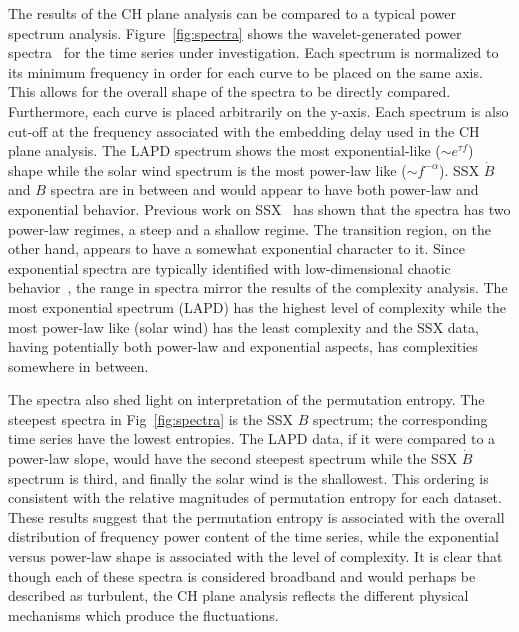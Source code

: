 \documentclass[aps,prx,twocolumn,secnumarabic,nobalancelastpage,amsmath,amssymb,
nofootinbib]{revtex4-1}
\begin{document}
The results of the CH plane analysis can be compared to a typical power spectrum analysis. Figure~\ref{fig:spectra} shows the wavelet-generated power spectra~\cite{torrence1998} for the time series under investigation. Each spectrum is normalized to its minimum frequency in order for each curve to be placed on the same axis. This allows for the overall shape of the spectra to be directly compared. Furthermore, each curve is placed arbitrarily on the y-axis. Each spectrum is also cut-off at the frequency associated with the embedding delay used in the CH plane analysis. The LAPD spectrum shows the most exponential-like ($\sim e^{\tau f}$) shape while the solar wind spectrum is the most power-law like ($\sim f^{-\alpha}$). SSX $\dot{B}$ and $B$ spectra are in between and would appear to have both power-law and exponential behavior. Previous work on SSX~\cite{schaffner2014c} has shown that the spectra has two power-law regimes, a steep and a shallow regime. The transition region, on the other hand, appears to have a somewhat exponential character to it. Since exponential spectra are typically identified with low-dimensional chaotic behavior~\cite{maggs2012}, the range in spectra mirror the results of the complexity analysis. The most exponential spectrum (LAPD) has the highest level of complexity while the most power-law like (solar wind) has the least complexity  and the SSX data, having potentially both power-law and exponential aspects, has complexities somewhere in between. 

The spectra also shed light on interpretation of the permutation entropy. The steepest spectra in Fig~\ref{fig:spectra} is the SSX $B$ spectrum; the corresponding time series have the lowest entropies. The LAPD data, if it were compared to a power-law slope, would have the second steepest spectrum while the SSX $\dot{B}$ spectrum is third, and finally the solar wind is the shallowest. This ordering is consistent with the relative magnitudes of permutation entropy for each dataset. These results suggest that the permutation entropy is associated with the overall distribution of frequency power content of the time series, while the exponential versus power-law shape is associated with the level of complexity. It is clear that though each of these spectra is considered broadband and would perhaps be described as turbulent, the CH plane analysis reflects the different physical mechanisms which produce the fluctuations.
\end{document}
